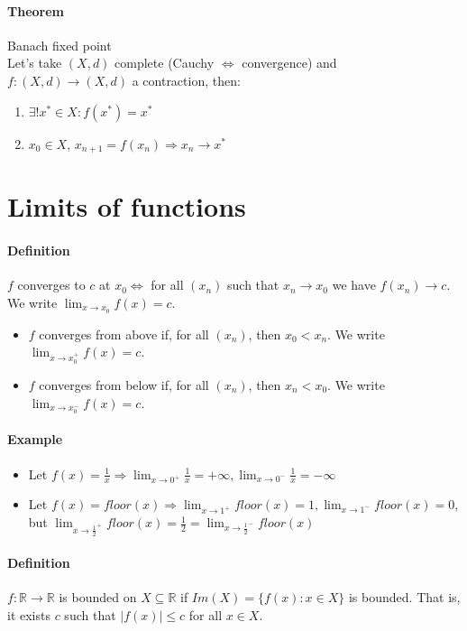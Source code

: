\documentclass{article}
\newcommand{\abs}[1]{\left|#1\right|}
\newcommand{\func}[3]{#1 : #2 \rightarrow #3}
\newcommand{\funcR}[1]{#1 : \mathbb{R} \rightarrow \mathbb{R}}
\newcommand{\limx}[1]{\lim_{x \to #1}}
\newcommand{\DS}{\displaystyle}
\newcommand{\R}{\mathbb{R}}
\newcommand{\Def}{\paragraph{Definition}}
\newcommand{\Theorem}{\paragraph{Theorem}}
\newcommand{\Example}{\paragraph{Example}}
\begin{document}
	\Theorem Banach fixed point
\\Let's take $(X,d)$ complete (Cauchy $\iff$ convergence) and
	$\func{f}{(X,d)}{(X,d)}$ a contraction, then:
	\begin{enumerate}[label=(\roman*)]
		\item $\exists! x^* \in X : f(x^*) = x^*$
		\item $x_0 \in X$, $x_{n+1} = f(x_n) \Rightarrow x_n \to x^*$
	\end{enumerate}


\section{Limits of functions}

	\Def $f$ converges to $c$ at $x_0 \iff$ for all $(x_n)$ such that $x_n \to x_0$
	we have $f(x_n) \to c$. We write $\DS \limx{x_0} f(x) = c$.
	\begin{itemize}
		\item $f$ converges from above if, for all $(x_n)$, then $x_0 < x_n$.
		We write $\DS \limx{x_0^+} f(x) = c$.
		\item $f$ converges from below if, for all $(x_n)$, then $x_n < x_0$.
		We write $\DS \limx{x_0^-} f(x) = c$.
	\end{itemize}

	\Example
	\begin{itemize}
		\item Let $\DS f(x) = \frac{1}{x} \Rightarrow \limx{0^+} \frac{1}{x} =
		+\infty, \limx{0^-} \frac{1}{x} = -\infty$
		\item Let $\DS f(x) = floor(x) \Rightarrow \limx{1^+} floor(x) = 1,
		\limx{1^-} floor(x) = 0$, but $\DS \limx{\frac{1}{2}^+} floor(x) =
		\frac{1}{2} = \limx{\frac{1}{2}^-} floor(x)$
	\end{itemize}

	\Def $\funcR{f}$ is bounded on $X \subseteq \R$ if $Im(X) = \{ f(x) : x \in X
	\}$ is bounded. That is, it exists $c$ such that $\abs{f(x)} \leq c$ for all
	$x \in X$.
\end{document}
